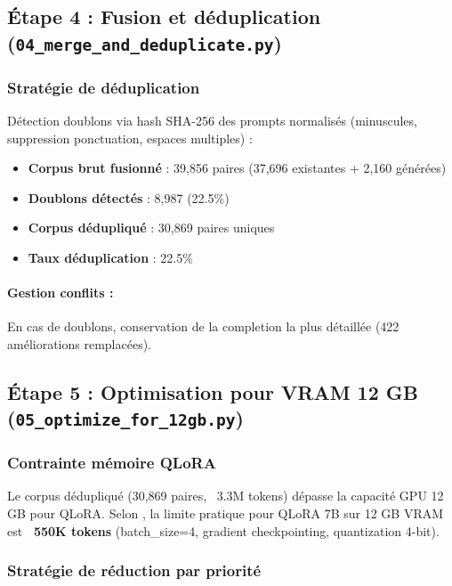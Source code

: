 \subsection{Étape 4 : Fusion et déduplication (\texttt{04\_merge\_and\_deduplicate.py})}

\subsubsection{Stratégie de déduplication}

Détection doublons via hash SHA-256 des prompts normalisés (minuscules, suppression ponctuation, espaces multiples) :

\begin{itemize}
    \item \textbf{Corpus brut fusionné} : 39,856 paires (37,696 existantes + 2,160 générées)
    
    \item \textbf{Doublons détectés} : 8,987 (22.5\%)
    
    \item \textbf{Corpus dédupliqué} : 30,869 paires uniques
    
    \item \textbf{Taux déduplication} : 22.5\%
\end{itemize}

\paragraph{Gestion conflits :} En cas de doublons, conservation de la completion la plus détaillée (422 améliorations remplacées).

\subsection{Étape 5 : Optimisation pour VRAM 12 GB (\texttt{05\_optimize\_for\_12gb.py})}

\subsubsection{Contrainte mémoire QLoRA}

Le corpus dédupliqué (30,869 paires, ~3.3M tokens) dépasse la capacité GPU 12 GB pour QLoRA. Selon \citet{dettmers2023qlora}, la limite pratique pour QLoRA 7B sur 12 GB VRAM est \textbf{~550K tokens} (batch\_size=4, gradient checkpointing, quantization 4-bit).

\subsubsection{Stratégie de réduction par priorité}

